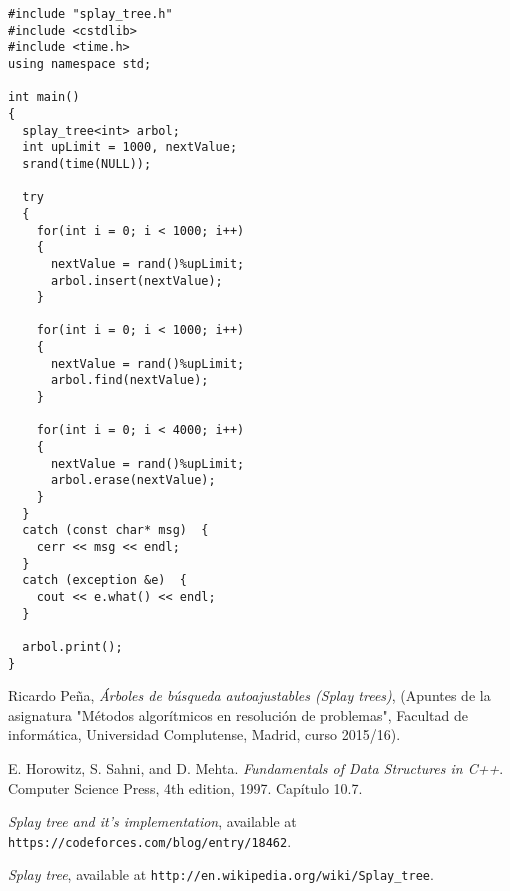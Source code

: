 \documentclass[letterpaper,12pt]{article}
\begin{document}
\begin{lstlisting}
#include "splay_tree.h"
#include <cstdlib>
#include <time.h>
using namespace std;

int main()
{
  splay_tree<int> arbol;
  int upLimit = 1000, nextValue;
  srand(time(NULL));

  try
  {
    for(int i = 0; i < 1000; i++)
    {
      nextValue = rand()%upLimit;
      arbol.insert(nextValue);
    }

    for(int i = 0; i < 1000; i++)
    {
      nextValue = rand()%upLimit;
      arbol.find(nextValue);
    }

    for(int i = 0; i < 4000; i++)
    {
      nextValue = rand()%upLimit;
      arbol.erase(nextValue);
    }
  }
  catch (const char* msg)  {
    cerr << msg << endl;
  }
  catch (exception &e)  {
    cout << e.what() << endl;
  }

  arbol.print(); 
}
\end{lstlisting}



\begin{thebibliography}{99}

Ricardo Peña, \textit{Árboles de búsqueda autoajustables (Splay trees)}, 
(Apuntes de la asignatura "Métodos algorítmicos en resolución de problemas",
Facultad de informática, Universidad Complutense, Madrid, curso 2015/16).

E. Horowitz, S. Sahni, and D. Mehta. \textit{Fundamentals of Data 
Structures in C++}. Computer Science Press, 4th edition, 1997. Capítulo 10.7.

\textit{Splay tree and it's implementation},  available at 
\texttt{https://codeforces.com/blog/entry/18462}.

\textit{Splay tree},  available at 
\texttt{http://en.wikipedia.org/wiki/Splay\_tree}.

\end{thebibliography}
\end{document}
